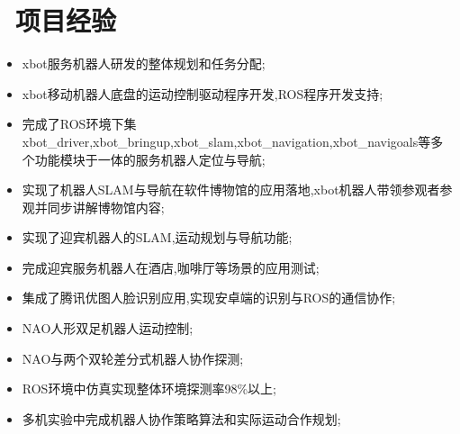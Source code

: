\documentclass{resume}
\begin{document}
\section{\faUsers\ 项目经验}

\begin{itemize}
  \item xbot服务机器人研发的整体规划和任务分配;
  \item xbot移动机器人底盘的运动控制驱动程序开发,ROS程序开发支持;
  \item 完成了ROS环境下集xbot\_driver,xbot\_bringup,xbot\_slam,xbot\_navigation,xbot\_navigoals等多个功能模块于一体的服务机器人定位与导航;
  \item 实现了机器人SLAM与导航在软件博物馆的应用落地,xbot机器人带领参观者参观并同步讲解博物馆内容;
\end{itemize}


\begin{itemize}
  \item 实现了迎宾机器人的SLAM,运动规划与导航功能;
  \item 完成迎宾服务机器人在酒店,咖啡厅等场景的应用测试;
  \item 集成了腾讯优图人脸识别应用,实现安卓端的识别与ROS的通信协作;  
\end{itemize}


\begin{onehalfspacing}
\begin{itemize}
  \item NAO人形双足机器人运动控制;
  \item NAO与两个双轮差分式机器人协作探测;
  \item ROS环境中仿真实现整体环境探测率98\%以上;
  \item 多机实验中完成机器人协作策略算法和实际运动合作规划;
\end{itemize}
\end{onehalfspacing}

\end{document}
